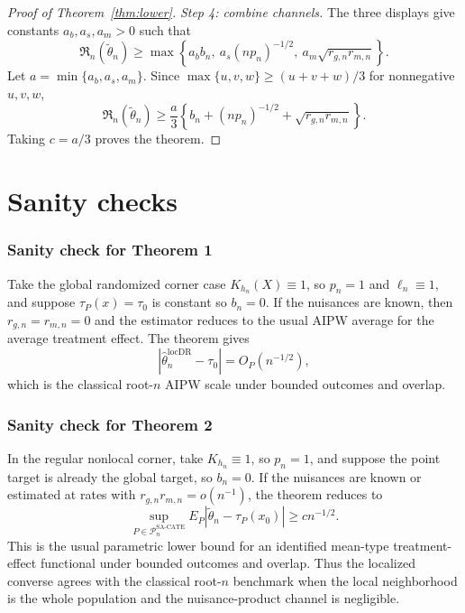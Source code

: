 \documentclass[11pt]{article}
\theoremstyle{definition}
\theoremstyle{plain}
\theoremstyle{remark}
\begin{document}
\begin{proof}[Proof of Theorem~\ref{thm:lower}]
\emph{Step 4: combine channels.}
The three displays give constants $a_b,a_s,a_m>0$ such that
\[
  \mathfrak R_n(\tilde\theta_n)
  \ge
  \max\left\{a_b b_n,\ a_s(n p_n)^{-1/2},\ a_m\sqrt{r_{g,n}r_{m,n}}\right\}.
\]
Let $a=\min\{a_b,a_s,a_m\}$. Since $\max\{u,v,w\}\ge (u+v+w)/3$ for nonnegative $u,v,w$,
\[
  \mathfrak R_n(\tilde\theta_n)
  \ge
  \frac{a}{3}\left\{b_n+(n p_n)^{-1/2}+\sqrt{r_{g,n}r_{m,n}}\right\}.
\]
Taking $c=a/3$ proves the theorem.
\end{proof}

\section{Sanity checks}
\subsubsection*{Sanity check for Theorem 1}
Take the global randomized corner case $K_{h_n}(X)\equiv1$, so $p_n=1$ and $\ell_n\equiv1$, and suppose
$\tau_P(x)=\tau_0$ is constant so $b_n=0$. If the nuisances are known, then
$r_{g,n}=r_{m,n}=0$ and the estimator reduces to the usual AIPW average for the average treatment
effect. The theorem gives
\[
  |\hat\theta_n^{\mathrm{locDR}}-\tau_0|=O_P(n^{-1/2}),
\]
which is the classical root-$n$ AIPW scale under bounded outcomes and overlap.

\subsubsection*{Sanity check for Theorem 2}
In the regular nonlocal corner, take $K_{h_n}\equiv1$, so $p_n=1$, and suppose the point target is already the global target, so $b_n=0$. If the nuisances are known or estimated at rates with $r_{g,n}r_{m,n}=o(n^{-1})$, the theorem reduces to
\[
  \sup_{P\in\mathcal{P}_n^{\mathrm{SA\text{-}CATE}}}
  E_P|\tilde\theta_n-\tau_P(x_0)|\ge c n^{-1/2}.
\]
This is the usual parametric lower bound for an identified mean-type treatment-effect functional under bounded outcomes and overlap. Thus the localized converse agrees with the classical root-$n$ benchmark when the local neighborhood is the whole population and the nuisance-product channel is negligible.
\end{document}
